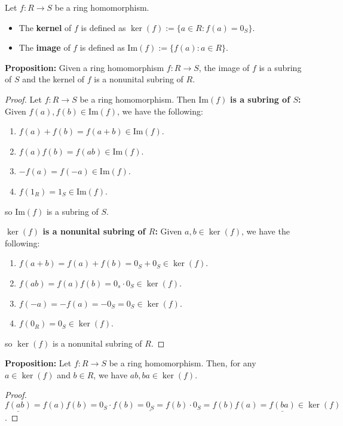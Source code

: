 \documentclass [12pt] {article}
\newenvironment{definition}[1]{\begin{tcolorbox}[title={Definition: #1},colback=blue!5!white,colframe=black!75!blue]}{\end{tcolorbox}}
\renewcommand{\bf}[1]{\textbf{{#1}}}
\newcommand{\ul}[1]{\underline{{#1}}}
\renewcommand{\Im}{\text{Im}}
\begin{document}
\begin{definition}{Kernel and Image}
    Let $f : R \to S$ be a ring homomorphism. 
    \begin{itemize}[label=$\to$, leftmargin=*, itemsep=0em]
        \item The \bf{kernel} of $f$ is defined as $\ker(f) := \{ a \in R : f(a) = 0_S \}$.
        \item The \bf{image} of $f$ is defined as $\Im(f) := \{ f(a) : a \in R \}$.
    \end{itemize}
\end{definition}
\bf{Proposition:} Given a ring homomorphism $f : R \to S$, the image of $f$ is a subring of $S$
and the kernel of $f$ is a nonunital subring of $R$.
\begin{proof}
    Let $f : R \to S$ be a ring homomorphism. Then
    \newline
    $\Im(f)$ \bf{is a subring of $S$:} 
    Given $f(a), f(b) \in \Im(f)$, we have the following:
    \begin{enumerate}[label=(\arabic*)]
        \item $f(a) + f(b) = f(a + b) \in \Im(f)$.
        \item $f(a)f(b) = f(ab) \in \Im(f)$.
        \item $-f(a) = f(-a) \in \Im(f)$.
        \item $f(1_R) = 1_S \in \Im(f)$.    
    \end{enumerate}
    so $\Im(f)$ is a subring of $S$.
    \vspace{1em}

    \bf{$\ker(f)$ is a nonunital subring of $R$:}
    Given $a, b \in \ker(f)$, we have the following:
    \begin{enumerate}[label=(\arabic*)]
        \item $f(a + b) = f(a) + f(b) = 0_S + 0_S \in \ker(f)$.
        \item $f(ab) = f(a)f(b) = 0_s \cdot 0_S \in \ker(f)$.
        \item $f(-a) = -f(a) = -0_S = 0_S \in \ker(f)$. 
        \item $f(0_R) = 0_S \in \ker(f)$.
    \end{enumerate}
    so $\ker(f)$ is a nonunital subring of $R$.
\end{proof}
\bf{Proposition:} Let $f : R \to S$ be a ring homomorphism. Then, for any $a \in \ker(f)$ and 
$b \in R$, we have $ab, ba \in \ker(f)$.
\begin{proof}
    $\ul{f(ab)} = f(a)f(b) = 0_S \cdot f(b) = \ul{0_S} = f(b) \cdot 0_S = f(b)f(a) = \ul{f(ba)} \in \ker(f)$.
\end{proof}
\end{document}
